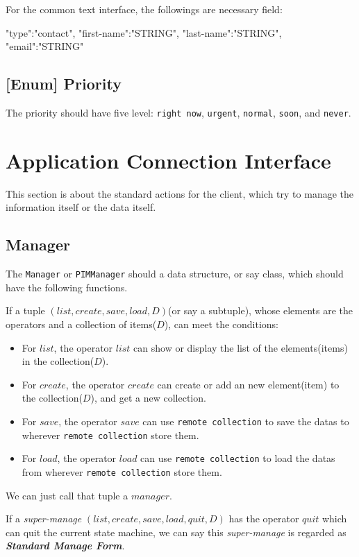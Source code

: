 \documentclass{article}
\begin{document}
    For the common text interface, the followings are necessary field: 
    \begin{json}
 {
     "type":"contact",
     "first-name":"{STRING}",
     "last-name":"{STRING}",
     "email":"{STRING}"
 }
    \end{json}
    
    
    \subsection{[Enum] Priority}
    The priority should have five level: \verb|right now|, \verb|urgent|, \verb|normal|, \verb|soon|, and \verb|never|.
    
    \section{Application Connection Interface}
    This section is about the standard actions for the client, which try to manage the information itself or the data itself.
    
    \subsection{Manager}
    The \lstinline|Manager| or \lstinline|PIMManager| should a data structure, or say class, which should have the following functions.
    
    If a tuple $(list,create,save,load,D)$(or say a subtuple), whose elements are the operators and a collection of items($D$), can meet the conditions:
    \begin{itemize}
        \item For $list$, the operator $list$ can show or display the list of the elements(items) in the collection($D$).
        \item For $create$, the operator $create$ can create or add an new element(item) to the collection($D$), and get a new collection.
        \item For $save$, the operator $save$ can use \verb|remote collection| to save the datas to wherever 
        \verb|remote collection| store them.
        \item For $load$, the operator $load$ can use \verb|remote collection| to load the datas from wherever
        \verb|remote collection| store them.
    \end{itemize}
    We can just call that tuple a $manager$. 
    
    If a \textit{super-manage} $(list,create,save,load,quit,D)$ has the operator $quit$ which can quit the current state machine,
    we can say this \textit{super-manage} is regarded as \textbf{\textit{Standard Manage Form}}. 
    
\end{document}
